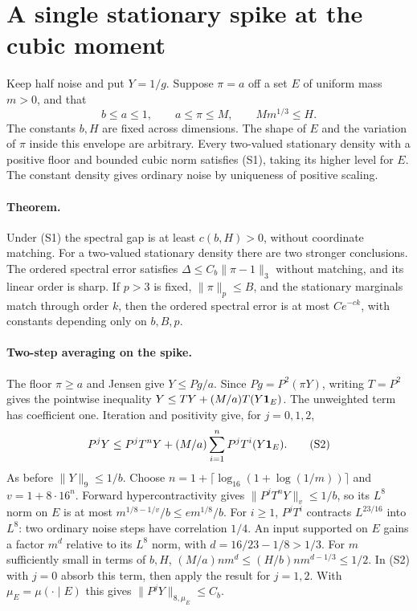 \section{A single stationary spike at the cubic moment}
\label{sec:stationary-spike}
Keep half noise and put $Y=1/g$. Suppose $\pi=a$ off a set $E$ of
uniform mass $m>0$, and that
\[
 b\le a\le1,\qquad a\le\pi\le M,\qquad M m^{1/3}\le H. \tag{S1}
\]
The constants $b,H$ are fixed across dimensions. The shape of $E$ and
the variation of $\pi$ inside this envelope are arbitrary. Every
two-valued stationary density with a positive floor and bounded cubic
norm satisfies (S1), taking its higher level for $E$. The constant
density gives ordinary noise by uniqueness of positive scaling.

\paragraph{Theorem.}
Under (S1) the spectral gap is at least $c(b,H)>0$, without coordinate
matching. For a two-valued stationary density there are two stronger
conclusions. The ordered spectral error satisfies $\Delta\le C_b\|\pi-1\|_3$
without matching, and its linear order is sharp. If $p>3$
is fixed, $\|\pi\|_p\le B$, and the stationary marginals match through
order $k$, then the ordered spectral error is at most $Ce^{-ck}$,
with constants depending only on $b,B,p$.

\paragraph{Two-step averaging on the spike.}
The floor $\pi\ge a$ and Jensen give $Y\le Pg/a$. Since
$Pg=P^2(\pi Y)$, writing $T=P^2$ gives the pointwise inequality
$Y\le TY+(M/a)T(Y{\bf1}_E)$. The unweighted term has coefficient one.
Iteration and positivity give, for $j=0,1,2$,
\[
 P^jY\le P^jT^nY+(M/a)\sum_{i=1}^nP^jT^i(Y{\bf1}_E). \tag{S2}
\]
As before $\|Y\|_9\le1/b$. Choose
$n=1+\lceil\log_{16}(1+\log(1/m))\rceil$ and $v=1+8\cdot16^n$.
Forward hypercontractivity gives $\|P^jT^nY\|_v\le1/b$, so its
$L^8$ norm on $E$ is at most $m^{1/8-1/v}/b\le e m^{1/8}/b$.
For $i\ge1$, $P^jT^i$ contracts $L^{23/16}$ into $L^8$:
two ordinary noise steps have correlation $1/4$. An input supported on
$E$ gains a factor $m^d$ relative to its $L^8$ norm, with
$d=16/23-1/8>1/3$. For $m$ sufficiently small in terms of $b,H$,
$(M/a)n m^d\le (H/b)n m^{d-1/3}\le1/2$. In (S2) with $j=0$
absorb this term, then apply the result for $j=1,2$. With
$\mu_E=\mu(\cdot\mid E)$ this gives $\|P^jY\|_{8,\mu_E}\le C_b$.

